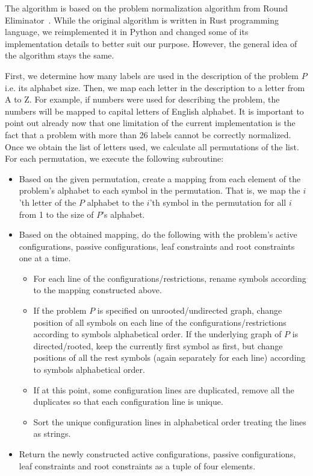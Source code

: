 The algorithm is based on the problem normalization algorithm
from Round Eliminator~\cite{FIXME}. While the original
algorithm is written in Rust programming language, we
reimplemented it in Python and changed some of its
implementation details to better suit our purpose.
However, the general idea of the algorithm stays the same.

First, we determine how many labels are used in the description of the
problem $P$ i.e. its alphabet size. Then, we map each letter in the description
to a letter from A to Z. For example, if numbers were used for describing
the problem, the numbers will be mapped to capital letters of
English alphabet. It is important to point out already now that
one limitation of the current implementation is the fact that
a problem with more than 26 labels cannot be correctly normalized.
Once we obtain the list of letters used, we calculate all
permutations of the list. For each permutation, we execute the following
subroutine:

\begin{itemize}
  \item Based on the given permutation, create a mapping from each
  element of the problem's alphabet to each symbol in the permutation.
  That is, we map the $i$'th letter of the $P$ alphabet to the $i$'th symbol
  in the permutation for all $i$ from 1 to the size of $P$'s alphabet.
  \item Based on the obtained mapping, do the following with the problem's
  active configurations, passive configurations, leaf constraints and
  root constraints one at a time.
  
  \begin{itemize}
    \item For each line of the configurations/restrictions, rename symbols
    according to the mapping constructed above.
    \item If the problem $P$ is specified on unrooted/undirected graph,
    change position of all symbols on each line of the configurations/restrictions according to symbols alphabetical order.
    If the underlying graph of $P$ is directed/rooted, keep the currently first
    symbol as first, but change positions of all the rest symbols (again separately for each line)
    according to symbols alphabetical order.
    \item If at this point, some configuration lines are
    duplicated, remove all the duplicates so that each configuration
    line is unique.
    \item Sort the unique configuration lines in alphabetical order
    treating the lines as strings.
  \end{itemize}

  \item Return the newly constructed active configurations,
  passive configurations, leaf constraints and root constraints as
  a tuple of four elements.
\end{itemize}

